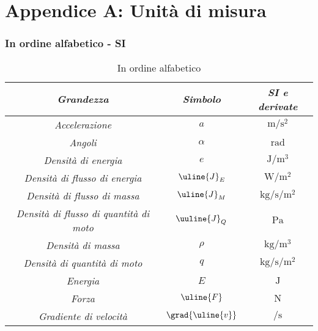 %
\renewcommand{\arraystretch}{1.2}
%
\chapter{Appendice A: Unità di misura}

\subsection*{In ordine alfabetico - SI}
		\begin{longtable}{ccc}
			\caption{In ordine alfabetico} \\
			\toprule
				\textbf{\textit{Grandezza}}	&	\textbf{\textit{Simbolo}}	&	\textbf{\textit{SI e derivate}}\\
			\toprule
			\endhead
				\textit{Accelerazione}		&		$a$		&		$\si{\meter \per \square \second}$\\
			\midrule
				\textit{Angoli}		&		$\alpha$		&		$\si{\radian}$\\
			\midrule						
				\textit{Densità di energia}			&		$e$		&		$\si{\joule \per \cubic \meter}$\\
			\midrule			
				\textit{Densità di flusso di energia}		&		$\uline{J}_E$		&		$\si{\watt \per \square \meter}$\\
			\midrule			
				\textit{Densità di flusso di massa}		&		$\uline{J}_M$		&		$\si{\kilogram \per \second \per \square \meter}$\\
			\midrule
				\textit{Densità di flusso di quantità di moto}		&		$\uuline{J}_Q$		&		$\si{\pascal}$	\\
			\midrule						
				\textit{Densità di massa}		&		$\rho$		&		$\si{\kilogram \per \cubic\meter}$\\
			\midrule
				\textit{Densità di quantità di moto}		&	$q$		&		$\si{\kilogram \per \second \per \square \meter}$\\
			\midrule
				\textit{Energia}		&		$E$		&		$\si{\joule}$\\
			\midrule
				\textit{Forza}		&		$\uline{F}$		&		$\si{\newton}$\\				
			\midrule
				\textit{Gradiente di velocità}		&		$\grad{\uline{v}}$		&		$\si{\per \second}$\\

\end{longtable}
